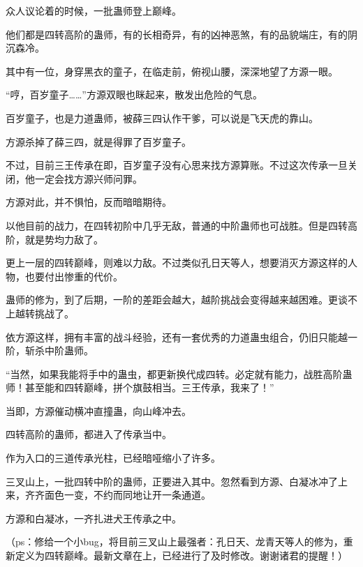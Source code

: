 \begin{this_body}
众人议论着的时候，一批蛊师登上巅峰。

他们都是四转高阶的蛊师，有的长相奇异，有的凶神恶煞，有的品貌端庄，有的阴沉森冷。

其中有一位，身穿黑衣的童子，在临走前，俯视山腰，深深地望了方源一眼。

“哼，百岁童子……”方源双眼也眯起来，散发出危险的气息。

百岁童子，也是力道蛊师，被薛三四认作干爹，可以说是飞天虎的靠山。

方源杀掉了薛三四，就是得罪了百岁童子。

不过，目前三王传承在即，百岁童子没有心思来找方源算账。不过这次传承一旦关闭，他一定会找方源兴师问罪。

方源对此，并不惧怕，反而暗暗期待。

以他目前的战力，在四转初阶中几乎无敌，普通的中阶蛊师也可战胜。但是四转高阶，就是势均力敌了。

更上一层的四转巅峰，则难以力敌。不过类似孔日天等人，想要消灭方源这样的人物，也要付出惨重的代价。

蛊师的修为，到了后期，一阶的差距会越大，越阶挑战会变得越来越困难。更谈不上越转挑战了。

依方源这样，拥有丰富的战斗经验，还有一套优秀的力道蛊虫组合，仍旧只能越一阶，斩杀中阶蛊师。

“当然，如果我能将手中的蛊虫，都更新换代成四转。必定就有能力，战胜高阶蛊师！甚至能和四转巅峰，拼个旗鼓相当。三王传承，我来了！”

当即，方源催动横冲直撞蛊，向山峰冲去。

四转高阶的蛊师，都进入了传承当中。

作为入口的三道传承光柱，已经暗哑缩小了许多。

三叉山上，一批四转中阶的蛊师，正要进入其中。忽然看到方源、白凝冰冲了上来，齐齐面色一变，不约而同地让开一条通道。

方源和白凝冰，一齐扎进犬王传承之中。

（ps：修给一个小bug，将目前三叉山上最强者：孔日天、龙青天等人的修为，重新定义为四转巅峰。最新文章在上，已经进行了及时修改。谢谢诸君的提醒！）

\end{this_body}

